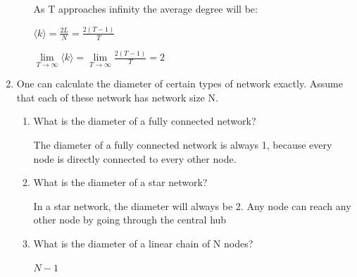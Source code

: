 \documentclass{amsart}
\theoremstyle{definition}
\theoremstyle{remark}
\numberwithin{equation}{section}
\begin{document}
\begin{enumerate}
\begin{enumerate}
As T approaches infinity the average degree will be:

\vspace{0.2cm}

$
\langle k \rangle = \frac{2L}{N} = \frac{2\left(T-1\right)}{T}
$

\vspace{0.2cm}

$
\lim\limits_{T\to \infty} \langle k \rangle = \lim\limits_{T\to \infty} \frac{2\left(T-1\right)}{T} = 2
$

\vspace{0.5cm}

\end{enumerate}

\vspace{3cm}
\item One can calculate the diameter of certain types of network exactly. Assume that each of these network has network size N.
\begin{enumerate}
\item What is the diameter of a fully connected network? \vspace{1cm}

The diameter of a fully connected network is always 1, because every node is directly connected to every other node.

\vspace{0.2cm}

\item What is the diameter of a star network? \vspace{1cm}

In a star network, the diameter will always be 2. Any node can reach any other node by going through the central hub


\vspace{0.2cm}

\item What is the diameter of a linear chain of N nodes? \vspace{0.5cm}

$N-1$


\end{enumerate}
\end{enumerate}
\end{document}
